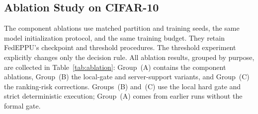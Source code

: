 \documentclass[lettersize,journal]{IEEEtran}
\begin{document}
\subsection{Ablation Study on CIFAR-10}
The component ablations use matched partition and training seeds, the same model initialization protocol, and the same training budget. They retain FedEPPU's checkpoint and threshold procedures. The threshold experiment explicitly changes only the decision rule. All ablation results, grouped by purpose, are collected in Table~\ref{tab:ablation}: Group~(A) contains the component ablations, Group~(B) the local-gate and server-support variants, and Group~(C) the ranking-risk corrections. Groups~(B) and~(C) use the local hard gate and strict deterministic execution; Group~(A) comes from earlier runs without the formal gate.
\end{document}
